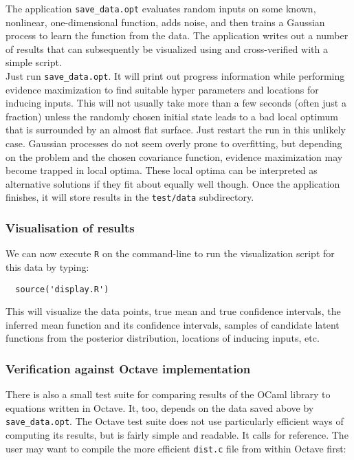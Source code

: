 \documentclass[10pt]{report}
\begin{document}
The application \verb=save_data.opt= evaluates random inputs on some known,
nonlinear, one-dimensional function, adds noise, and then trains a Gaussian
process to learn the function from the data.  The application writes out a
number of results that can subsequently be visualized using
 and cross-verified with a simple
 script.\\

Just run \verb=save_data.opt=.  It will print out progress information while
performing evidence maximization to find suitable hyper parameters and locations
for inducing inputs.  This will not usually take more than a few seconds (often
just a fraction) unless the randomly chosen initial state leads to a bad local
optimum that is surrounded by an almost flat surface.  Just restart the run in
this unlikely case.  Gaussian processes do not seem overly prone to overfitting,
but depending on the problem and the chosen covariance function, evidence
maximization may become trapped in local optima. These local optima can be
interpreted as alternative solutions if they fit about equally well though. Once
the application finishes, it will store results in the \verb=test/data=
subdirectory.

\subsubsection{Visualisation of results}

We can now execute \verb=R= on the command-line to run the visualization script
for this data by typing:

\begin{verbatim}
  source('display.R')
\end{verbatim}

This will visualize the data points, true mean and true confidence intervals,
the inferred mean function and its confidence intervals, samples of candidate
latent functions from the posterior distribution, locations of inducing inputs,
etc.

\subsubsection{Verification against Octave implementation}

There is also a small test suite for comparing results of the OCaml library to
equations written in Octave.  It, too, depends on the data saved above by
\verb=save_data.opt=.  The Octave test suite does not use particularly efficient
ways of computing its results, but is fairly simple and readable.  It calls
 for reference.  The user may want to compile the
more efficient \verb=dist.c= file from within Octave first:
\end{document}
